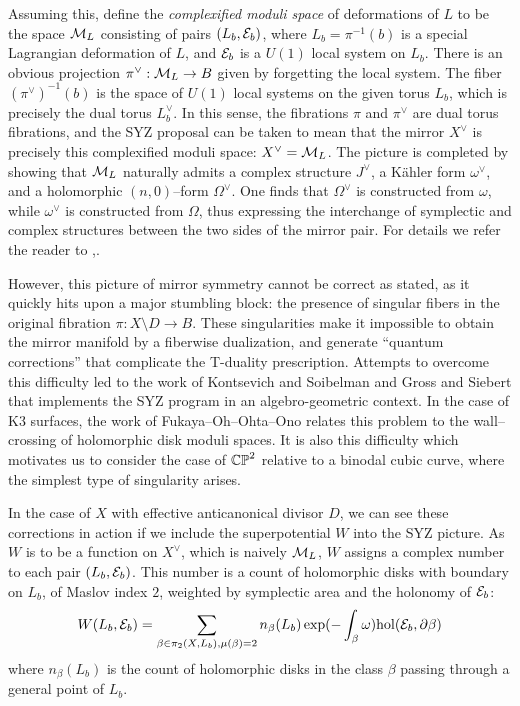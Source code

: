 \documentclass[12pt]{amsart}
\begin{document}
Assuming this, define the \emph{complexified moduli space} of
deformations of $L$ to be the space $\mathcal{M}_L$ consisting of pairs
$(L_b,\mathcal{E}_b)$, where $L_b = \pi^{-1}(b)$ is a special Lagrangian
deformation of $L$, and $\mathcal{E}_b$ is a $U(1)$ local system on
$L_b$. There is an obvious projection $\pi^\vee : \mathcal{M}_L \to B$ given
by forgetting the local system. The fiber $(\pi^\vee)^{-1}(b)$ is the
space of $U(1)$ local systems on the given torus $L_b$, which is
precisely the dual torus $L_b^\vee$. In this sense, the fibrations
$\pi$ and $\pi^\vee$ are dual torus fibrations, and the SYZ proposal
can be taken to mean that the mirror $X^\vee$ is precisely this
complexified moduli space: $X^\vee = \mathcal{M}_L$. The picture is completed
by showing that $\mathcal{M}_L$ naturally admits a complex structure $J^\vee$,
a K\"{a}hler form $\omega^\vee$, and a holomorphic $(n,0)$--form
$\Omega^\vee$. One finds that $\Omega^\vee$ is constructed from
$\omega$, while $\omega^\vee$ is constructed from $\Omega$, thus
expressing the interchange of symplectic and complex structures
between the two sides of the mirror pair. For details we refer the
reader to \cite{hitchin-slag},\cite[\S 2]{auroux07}.

However, this picture of mirror symmetry cannot be correct as stated,
as it quickly hits upon a major stumbling block: the presence of
singular fibers in the original fibration $\pi: X\setminus D \to
B$. These singularities make it impossible to obtain the mirror
manifold by a fiberwise dualization, and generate ``quantum
corrections'' that complicate the T-duality prescription. Attempts to
overcome this difficulty led to the work of Kontsevich and Soibelman
\cite{ks-torus-fibrations,ks-nonarchimedean} and Gross and Siebert
\cite{gs-affine-log-mirror,gs-log-degen-I,gs-log-degen-II} that
implements the SYZ program in an algebro-geometric context. In the
case of K3 surfaces, the work of Fukaya--Oh--Ohta--Ono
\cite{fooo-ch10} relates this problem to the wall--crossing of
holomorphic disk moduli spaces. It is also this difficulty which
motivates us to consider the case of $\mathbb{CP}^2$ relative to a binodal
cubic curve, where the simplest type of singularity arises.

In the case of $X$ with effective anticanonical divisor $D$, we can
see these corrections in action if we include the superpotential $W$
into the SYZ picture. As $W$ is to be a function on $X^\vee$, which is
naively $\mathcal{M}_L$, $W$ assigns a complex number to each pair
$(L_b,\mathcal{E}_b)$. This number is a count of holomorphic disks with
boundary on $L_b$, of Maslov index $2$, weighted by symplectic area
and the holonomy of $\mathcal{E}_b$:
\begin{equation}
  \label{eq:disk-superpotential}
  W(L_b,\mathcal{E}_b) = \sum_{\beta \in \pi_2(X,L_b), \mu(\beta) =
    2}n_\beta(L_b) \exp(-\int_\beta \omega) \mathrm{hol}(\mathcal{E}_b,\partial \beta)
\end{equation}
where $n_\beta(L_b)$ is the count of holomorphic disks in the class
$\beta$ passing through a general point of $L_b$.
\end{document}

